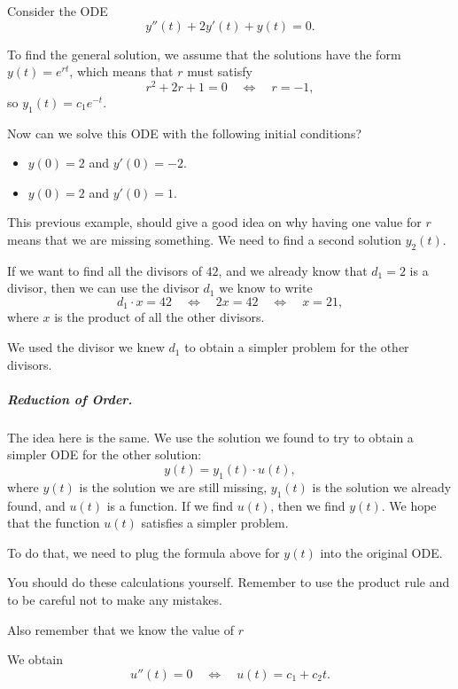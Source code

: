 \begin{example}
Consider the ODE 
$$
y''(t) + 2y'(t) + y(t) = 0.
$$	

To find the general solution, we assume that the solutions have the form $y(t) = e^{rt}$, which means that $r$ must satisfy
$$
r^2 +2r+1 = 0 
	\quad \Leftrightarrow \quad r=-1,
$$
so $y_1(t) = c_1 e^{-t}$.

Now can we solve this ODE with the following initial conditions?
\begin{itemize}
	\item $y(0)=2$ and $y'(0)=-2$.
	\item $y(0)=2$ and $y'(0)=1$.
\end{itemize}
\end{example}

This previous example, should give a good idea on why having one value for $r$ means that we are missing something. 
We need to find a second solution $y_2(t)$. \\


\begin{graybox}
If we want to find all the divisors of $42$, and we already know that $d_1=2$ is a divisor, then we can use the divisor $d_1$ we know to write 
$$
d_1 \cdot x = 42 
	\quad \Leftrightarrow\quad 2x = 42
	\quad \Leftrightarrow\quad x = 21,
$$
where $x$ is the product of all the other divisors.

We used the divisor we knew $d_1$ to obtain a simpler problem for the other divisors.
\end{graybox}


\subparagraph{\color{cyan}Reduction of Order.} The idea here is the same. We use the solution we found to try to obtain a simpler ODE for the other solution:
$$
y(t) = y_1(t) \cdot u(t),
$$
where $y(t)$ is the solution we are still missing, $y_1(t)$ is the solution we already found, and $u(t)$ is a function. If we find $u(t)$, then we find $y(t)$. We hope that the function $u(t)$ satisfies a simpler problem.

To do that, we need to plug the formula above for $y(t)$ into the original ODE. 

\begin{graybox}
You should do these calculations yourself.
Remember to use the product rule and to be careful not to make any mistakes.	

Also remember that we know the value of $r$
\end{graybox}

We obtain
$$
u''(t) = 0
\quad \Leftrightarrow \quad u(t) = c_1 + c_2 t.
$$

